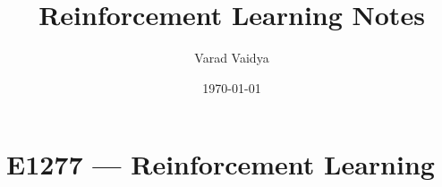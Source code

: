 \documentclass[working,a4paper,11pt]{article}
\title{Reinforcement Learning Notes}
\author{Varad Vaidya}
\date{\today}
\begin{document}
  \createintro

  \part{E1277 --- Reinforcement Learning}
  
  \clearpage
  
  
\end{document}
